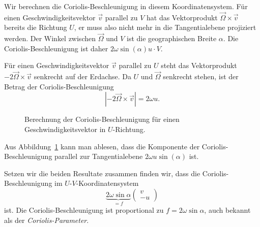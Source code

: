 Wir berechnen die Coriolis-Beschleunigung in diesem Koordinatensystem.
Für einen Geschwindigkeitsvektor $\vec{v}$ parallel zu $V$ hat das
Vektorprodukt $\vec{\Omega}\times \vec{v}$ bereits die Richtung $U$,
er muss also nicht mehr in die Tangentialebene projiziert werden.
Der Winkel zwischen $\vec{\Omega}$ und $V$ ist die geographischen Breite
$\alpha$.
Die Coriolis-Beschleunigung ist daher $2\omega \sin(\alpha)u\cdot V$.

Für einen Geschwindigkeitsvektor $\vec{v}$ parallel zu $U$ steht
das Vektorprodukt $-2\vec{\Omega}\times\vec{v}$ senkrecht auf 
der Erdachse.
Da $U$ und $\vec{\Omega}$ senkrecht stehen, ist der Betrag der 
Coriolis-Beschleunigung
\[
|\text{$-2\vec{\Omega}\times\vec{v}$}|
=
2\omega u.
\]
\begin{figure}
\centering
{}
\caption{Berechnung der Coriolis-Beschleunigung für einen
Geschwindigkeitsvektor in $U$-Richtung.
\label{skript:U-coriolis}}
\end{figure}%
Aus Abbildung~\ref{skript:U-coriolis} kann man ablesen,
dass die Komponente der Coriolis-Beschleunigung parallel
zur Tangentialebene $2\omega u\sin(\alpha)$ ist.

Setzen wir die beiden Resultate zusammen finden wir, dass die
Coriolis-Beschleunigung im $U$-$V$-Koordinatensystem
\begin{equation}
\underbrace{
2\omega
\sin\alpha}_{\displaystyle=f}
\begin{pmatrix}
v\\
-u
\end{pmatrix}
\label{skript:physik:coriolis}
\end{equation}
ist.
Die Coriolis-Beschleunigung ist proportional zu $f=2\omega\sin\alpha$, auch
bekannt als der {\em Coriolis-Parameter}.
%

